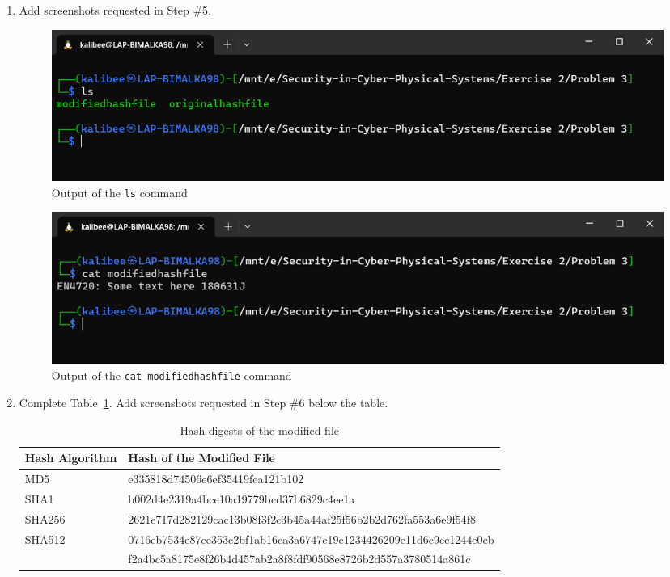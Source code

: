\documentclass[11pt,letterpaper]{article}
\newenvironment{answer}{\em \color{blue} \begin{adjustwidth}{1cm}{1cm}}{\end{adjustwidth}}
\begin{document}
\begin{enumerate}
		\item Add screenshots requested in Step \#5.
		
		\begin{answer}
			\begin{figure}[H]
				\centering
				\includegraphics[width=0.7\columnwidth]{images/p3/s7}
				\caption{Output of the {\tt ls} command} \label{fig:pa-ls2}
			\end{figure}
			
			\begin{figure}[H]
				\centering
				\includegraphics[width=0.7\columnwidth]{images/p3/s8}
				\caption{Output of the {\tt cat modifiedhashfile} command} \label{fig:pa-cat2}
			\end{figure}
		\end{answer}
		
		\item Complete Table~\ref{tab:hash-digest-modifiedhashfile}. Add screenshots requested in Step \#6 below the table.		
		
		\begin{table}[h]
			\caption{Hash digests of the modified file
			} \label{tab:hash-digest-modifiedhashfile}
			\begin{tabularx}{\columnwidth}{|p{4cm}|X|}
				\hline
				\textbf{Hash Algorithm} & \textbf{Hash of the Modified File} \\
				\hline
				MD5 & e335818d74506e6ef35419fea121b102 \\ \hline
				
				\hline
				SHA1 & b002d4e2319a4bce10a19779bcd37b6829c4ee1a \\ \hline
				
				\hline
				SHA256 & 2621e717d282129cac13b08f3f2c3b45a44af25f56b2b2d762fa553a6e9f54f8 \\ \hline
				
				\hline
				SHA512 & 0716eb7534e87ee353c2bf1ab16ca3a6747c19c1234426209e11d6c9ce1244e0cb\\&f2a4bc5a8175e8f26b4d457ab2a8f8fdf90568e8726b2d557a3780514a861c \\ \hline
				

\end{tabularx}
\end{table}
\end{enumerate}
\end{document}
